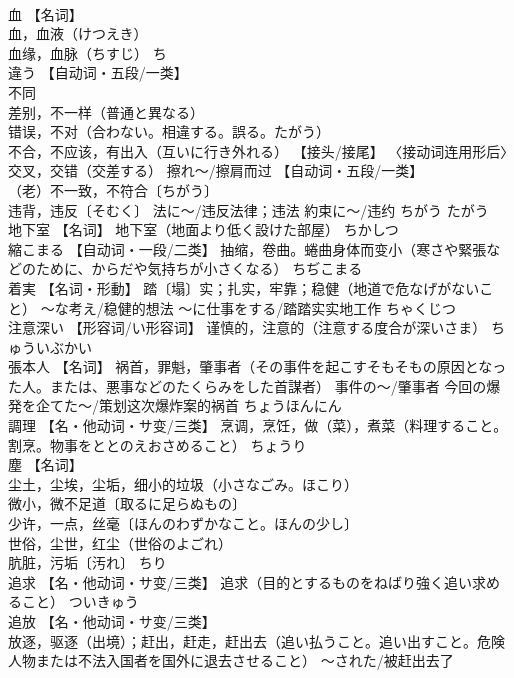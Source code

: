 \documentclass[8pt]{extreport}
\begin{document}
\begin{CJK}{UTF8}{min}
\\	血	【名词】 
\\	血，血液（けつえき） 
\\	血缘，血脉（ちすじ）	ち	
\\	違う	【自动词・五段/一类】 
\\	不同 
\\	差别，不一样（普通と異なる） 
\\	错误，不对（合わない。相違する。誤る。たがう） 
\\	不合，不应该，有出入（互いに行き外れる） 【接头/接尾】 〈接动词连用形后〉交叉，交错（交差する） 擦れ～/擦肩而过 【自动词・五段/一类】 
\\	（老）不一致，不符合〔ちがう〕 
\\	违背，违反〔そむく〕 法に～/违反法律；违法 約束に～/违约	ちがう たがう	
\\	地下室	【名词】 地下室（地面より低く設けた部屋）	ちかしつ	
\\	縮こまる	【自动词・一段/二类】 抽缩，卷曲。蜷曲身体而变小（寒さや緊張などのために、からだや気持ちが小さくなる）	ちぢこまる	
\\	着実	【名词・形動】 踏〔塌〕实；扎实，牢靠；稳健（地道で危なげがないこと） ～な考え/稳健的想法 ～に仕事をする/踏踏实实地工作	ちゃくじつ	
\\	注意深い	【形容词/い形容词】 谨慎的，注意的（注意する度合が深いさま）	ちゅういぶかい	
\\	張本人	【名词】 祸首，罪魁，肇事者（その事件を起こすそもそもの原因となった人。または、悪事などのたくらみをした首謀者） 事件の～/肇事者 今回の爆発を企てた～/策划这次爆炸案的祸首	ちょうほんにん	
\\	調理	【名・他动词・サ变/三类】 烹调，烹饪，做（菜），煮菜（料理すること。割烹。物事をととのえおさめること）	ちょうり	
\\	塵	【名词】 
\\	尘土，尘埃，尘垢，细小的垃圾（小さなごみ。ほこり） 
\\	微小，微不足道〔取るに足らぬもの〕 
\\	少许，一点，丝毫〔ほんのわずかなこと。ほんの少し〕 
\\	世俗，尘世，红尘（世俗のよごれ） 
\\	肮脏，污垢〔汚れ〕	ちり	
\\	追求	【名・他动词・サ变/三类】 追求（目的とするものをねばり強く追い求めること）	ついきゅう	
\\	追放	【名・他动词・サ变/三类】 
\\	放逐，驱逐（出境）；赶出，赶走，赶出去（追い払うこと。追い出すこと。危険人物または不法入国者を国外に退去させること） ～された/被赶出去了 

\end{CJK}
\end{document}
